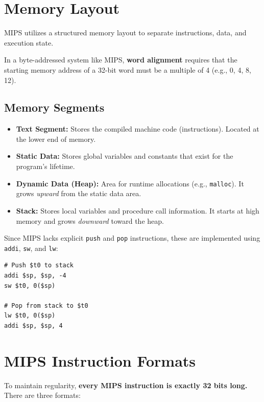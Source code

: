 \section{Memory Layout}

MIPS utilizes a structured memory layout to separate instructions, data, and execution state.

\begin{definition}
In a byte-addressed system like MIPS, \textbf{word alignment} requires that the starting memory address of a 32-bit word must be a multiple of 4 (e.g., 0, 4, 8, 12).
\end{definition}

\subsection{Memory Segments}

\begin{itemize}
    \item \textbf{Text Segment:} Stores the compiled machine code (instructions). Located at the lower end of memory.
    \item \textbf{Static Data:} Stores global variables and constants that exist for the program's lifetime.
    \item \textbf{Dynamic Data (Heap):} Area for runtime allocations (e.g., \texttt{malloc}). It grows \textit{upward} from the static data area.
    \item \textbf{Stack:} Stores local variables and procedure call information. It starts at high memory and grows \textit{downward} toward the heap.
\end{itemize}

\begin{example}
Since MIPS lacks explicit \texttt{push} and \texttt{pop} instructions, these are implemented using \texttt{addi}, \texttt{sw}, and \texttt{lw}:
\begin{verbatim}
# Push $t0 to stack
addi $sp, $sp, -4
sw $t0, 0($sp)

# Pop from stack to $t0
lw $t0, 0($sp)
addi $sp, $sp, 4
\end{verbatim}
\end{example}

\section{MIPS Instruction Formats}

To maintain regularity, \textbf{every MIPS instruction is exactly 32 bits long.} There are three formats:

